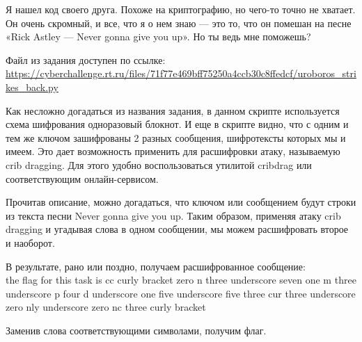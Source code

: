 
Я нашел код своего друга. Похоже на криптографию, но чего-то точно не хватает. Он очень скромный, и все, что я о нем знаю — это то, что он помешан на песне «Rick Astley — Never gonna give you up». Но ты ведь мне поможешь?

Файл из задания доступен по ссылке: \url{https://cyberchallenge.rt.ru/files/71f77e469bff75250a4ccb30c8ffedcf/uroboros_strikes_back.py}

\solutionSection

Как несложно догадаться из названия задания, в данном скрипте используется схема шифрования одноразовый блокнот. И еще в скрипте видно, что с одним и тем же ключом зашифрованы 2 разных сообщения, шифротексты которых мы и имеем. Это дает возможность применить для расшифровки атаку, называемую crib dragging. Для этого удобно воспользоваться утилитой cribdrag или соответствующим онлайн-сервисом.

Прочитав описание, можно догадаться, что ключом или сообщением будут строки из текста песни Never gonna give you up. Таким образом, применяя атаку crib dragging и угадывая слова в одном сообщении, мы можем расшифровать второе и наоборот.

В результате, рано или поздно, получаем расшифрованное сообщение:\\
the flag for this task is cc curly bracket zero n three underscore seven one m three underscore p four d underscore one five underscore five three cur three underscore zero nly underscore zero nc three curly bracket

Заменив слова соответствующими символами, получим флаг.

